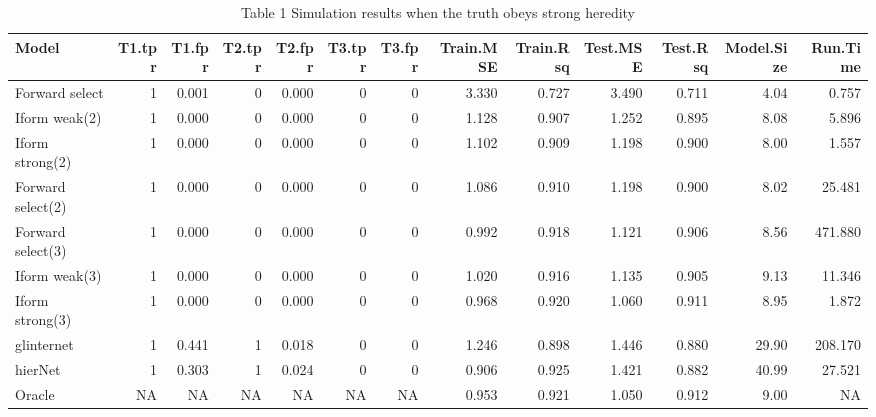 \documentclass[11pt,]{book}
\theoremstyle{definition}
\theoremstyle{definition}
\theoremstyle{remark}
\begin{document}
\begin{table}

\caption{\label{tab:Chap3sim1}Table 1 Simulation results when the truth obeys strong heredity}
\centering
\begin{tabular}[t]{lrrrrrrrrrrrr}
\toprule
Model & T1.tpr & T1.fpr & T2.tpr & T2.fpr & T3.tpr & T3.fpr & Train.MSE & Train.Rsq & Test.MSE & Test.Rsq & Model.Size & Run.Time\\
\midrule
Forward select & 1 & 0.001 & 0 & 0.000 & 0 & 0 & 3.330 & 0.727 & 3.490 & 0.711 & 4.04 & 0.757\\
Iform weak(2) & 1 & 0.000 & 0 & 0.000 & 0 & 0 & 1.128 & 0.907 & 1.252 & 0.895 & 8.08 & 5.896\\
Iform strong(2) & 1 & 0.000 & 0 & 0.000 & 0 & 0 & 1.102 & 0.909 & 1.198 & 0.900 & 8.00 & 1.557\\
Forward select(2) & 1 & 0.000 & 0 & 0.000 & 0 & 0 & 1.086 & 0.910 & 1.198 & 0.900 & 8.02 & 25.481\\
Forward select(3) & 1 & 0.000 & 0 & 0.000 & 0 & 0 & 0.992 & 0.918 & 1.121 & 0.906 & 8.56 & 471.880\\
\addlinespace
Iform weak(3) & 1 & 0.000 & 0 & 0.000 & 0 & 0 & 1.020 & 0.916 & 1.135 & 0.905 & 9.13 & 11.346\\
Iform strong(3) & 1 & 0.000 & 0 & 0.000 & 0 & 0 & 0.968 & 0.920 & 1.060 & 0.911 & 8.95 & 1.872\\
glinternet & 1 & 0.441 & 1 & 0.018 & 0 & 0 & 1.246 & 0.898 & 1.446 & 0.880 & 29.90 & 208.170\\
hierNet & 1 & 0.303 & 1 & 0.024 & 0 & 0 & 0.906 & 0.925 & 1.421 & 0.882 & 40.99 & 27.521\\
Oracle & NA & NA & NA & NA & NA & NA & 0.953 & 0.921 & 1.050 & 0.912 & 9.00 & NA\\
\bottomrule
\end{tabular}
\end{table}
\end{document}
